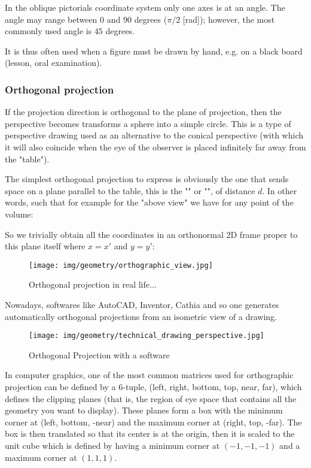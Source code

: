 	In the oblique pictorials coordinate system only one axes is at an angle. The angle may range between $0$ and $90$ degrees ($\pi/2$ [rad]); however, the most commonly used angle is $45$ degrees.

 	It is thus often used when a figure must be drawn by hand, e.g. on a black board (lesson, oral examination).
 	
 	\pagebreak
 	\subsubsection{Orthogonal projection}
	If the projection direction is orthogonal to the plane of projection, then the perspective becomes transforms a sphere into a simple circle. This is a type of perspective drawing used as an alternative to the conical perspective (with which it will also coincide when the eye of the observer is placed infinitely far away from the "table").

	The simplest orthogonal projection to express is obviously the one that sends space on a plane parallel to the table, this is the "" or "", of distance $d$. In other words, such that for example for the "above view" we have for any point of the volume:
	
	So we trivially obtain all the coordinates in an orthonormal 2D frame proper to this plane itself where $x=x'$ and $y=y'$:
	\begin{figure}[H]
		\centering
		\texttt{[image: img/geometry/orthographic\_view.jpg]}
		\caption{Orthogonal projection in real life...}
	\end{figure}
	Nowadays, softwares like AutoCAD, Inventor, Cathia and so one generates automatically orthogonal projections from an isometric view of a drawing.
	\begin{figure}[H]
		\centering
		\texttt{[image: img/geometry/technical\_drawing\_perspective.jpg]}
		\caption[]{Orthogonal Projection with a software}
	\end{figure}
	In computer graphics, one of the most common matrices used for orthographic projection can be defined by a $6$-tuple, (left, right, bottom, top, near, far), which defines the clipping planes (that is, the region of eye space that contains all the geometry you want to display). These planes form a box with the minimum corner at (left, bottom, -near) and the maximum corner at (right, top, -far). The box is then translated so that its center is at the origin, then it is scaled to the unit cube which is defined by having a minimum corner at $(-1,-1,-1)$ and a maximum corner at $(1,1,1)$.

